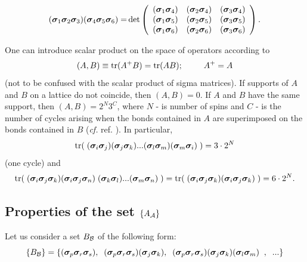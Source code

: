 \documentclass[a4paper]{jpconf}
\renewcommand\[{\begin{equation}}
\renewcommand\]{\end{equation}}
\newcommand{\ssigma}{{\bm \sigma}}
\newcommand{\A}{{\cal A}}
\newcommand{\B}{{\cal B}}
\begin{document}
\[{\rm{(}}{{\ssigma}_1}{{\ssigma}_2}{{\ssigma}_3}{\rm{)(}}{{\ssigma}_4}{{\ssigma}_5}{{\ssigma}_6}{\rm{) = }}\det \left( {\begin{array}{*{20}{c}}
	{{\rm{(}}{{\ssigma}_1}{{\ssigma}_4}{\rm{)}}}&{{\rm{(}}{{\ssigma}_2}{{\ssigma}_4}{\rm{)}}}&{{\rm{(}}{{\ssigma}_3}{{\ssigma}_4}{\rm{)}}}\\
	{{\rm{(}}{{\ssigma}_1}{{\ssigma}_5}{\rm{)}}}&{{\rm{(}}{{\ssigma}_2}{{\ssigma}_5}{\rm{)}}}&{{\rm{(}}{{\ssigma}_3}{{\ssigma}_5}{\rm{)}}}\\
	{{\rm{(}}{{\ssigma}_1}{{\ssigma}_6}{\rm{)}}}&{{\rm{(}}{{\ssigma}_2}{{\ssigma}_6}{\rm{)}}}&{{\rm{(}}{{\ssigma}_3}{{\ssigma}_6}{\rm{)}}}
	\end{array}} \right)
\label{mixeddet}
.\]

One can introduce scalar product on the space of operators according to 
\[(A,B) \equiv \mathop{\rm{tr}}(A^+ B) = \mathop{\rm{tr}}(AB);\qquad {A^ + } = A\]
(not to be confused with the scalar product of sigma matrices).
If supports of $A$ and $B$ on a lattice do not coincide, then $(A,B) = 0$.
If $A$ and $B$ have the same support, then $\left( {A,B} \right) = {2^N}{3^C}$,
where $N$ - is number of spins and $C$ - is the number of cycles  arising when the bonds contained in $A$ are superimposed on the bonds contained in $B$ ({\it cf.} ref. \cite{BeachSandvik}). In particular,
\[{\rm{tr}}(\;({{\ssigma}_i}{{\ssigma}_j})({{\ssigma}_j}{{\ssigma}_k})...({{\ssigma}_l}{{\ssigma}_m})({{\ssigma}_m}{{\ssigma}_i})\;) = 3 \cdot {2^N}\]
(one cycle) and 
\[
{\rm{tr}}(\;({{\ssigma}_i}{{\ssigma}_j}{{\ssigma}_k})({{\ssigma}_i}{{\ssigma}_j}{{\ssigma}_n})\;({{\ssigma}_k}{{\ssigma}_l})...({{\ssigma}_m}{{\ssigma}_n})\;) =
{\rm{tr}}(\;({{\ssigma}_i}{{\ssigma}_j}{{\ssigma}_k})({{\ssigma}_i}{{\ssigma}_j}{{\ssigma}_k})\;) = 6 \cdot {2^N}.
\]

\subsection{Properties  of the set $\{A_\A\}$}
Let us consider a set  ${B_\B}$ of the following form:
$$
\{ B_\B \}  = \{ ({\bf \ssigma}_p{\bf\ssigma}_r{\bf\ssigma}_s),\;\;
({\bf \ssigma}_p{\bf\ssigma}_r{\bf\ssigma}_s)({\bf \ssigma}_j{\bf\ssigma}_k), \;\;
({\bf \ssigma}_p{\bf\ssigma}_r{\bf\ssigma}_s)({\bf \ssigma}_j{\bf\ssigma}_k)({\bf \ssigma}_l{\bf\ssigma}_m)\;\;,\;\;...\}
$$
\end{document}
